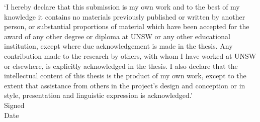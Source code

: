 \documentclass[a4paper, twoside, openright, 11pt, oldfontcommands]{memoir}
\begin{document}
`I hereby declare that this submission is my own work and to the best of my
knowledge it contains no materials previously published or written by another
person, or substantial proportions of material which have been accepted for
the award of any other degree or diploma at UNSW or any other educational
institution, except where due acknowledgement is made in the thesis. Any
contribution made to the research by others, with whom I have worked at UNSW
or elsewhere, is explicitly acknowledged in the thesis.  I also declare that
the intellectual content of this thesis is the product of my own work, except
to the extent that assistance from others in the project's design and
conception or in style, presentation and linguistic expression is
acknowledged.'\\[0.5cm]
Signed\hspace{0.5cm}\dotfill\hfill\\[0.5cm]
Date\hspace{0.5cm}\dotfill\hfill\\
\vfil\clearpage
\end{document}
